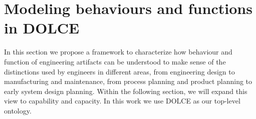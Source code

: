 \documentclass[sw]{iosart2x}
\newcommand{\DOLCE}{\textsc{DOLCE}\xspace} %
\begin{document}
\section{Modeling behaviours and functions in \DOLCE \label{sec:capabilitiesEtc}}
In this section we propose a framework to characterize how behaviour and function of engineering artifacts can be understood to make sense of the distinctions used by engineers in different areas, from engineering design to manufacturing and maintenance, from process planning and product planning to early system design planning. Within the following section, we will expand this view to capability and capacity.
In this work we use \DOLCE as our top-level ontology.
\end{document}

